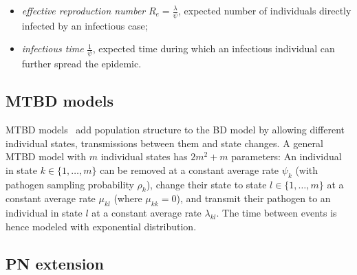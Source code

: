 \documentclass[a4paper,10pt]{article}
\begin{document}
\begin{itemize}
\item \textit{effective reproduction number} $R_e = \frac{\lambda}{\psi}$, expected number of individuals directly infected by an infectious case;
\item \textit{infectious time} $\frac{1}{\psi}$, expected time during which an infectious individual can further spread the epidemic.
\end{itemize} 



\subsection{MTBD models}
MTBD models~\citep{Stadler2013a} add population structure to the BD model by allowing different individual states, transmissions between them and state changes. A general MTBD model with $m$ individual states has $2m^2 + m$ parameters: An individual in state $k \in \{1, \ldots, m\}$ can be removed at a constant average rate $\psi_k$ (with pathogen sampling probability $\rho_k$), change their state to state $l \in \{1, \ldots, m\}$ at a constant average rate $\mu_{kl}$ (where $\mu_{kk} = 0$), and transmit their pathogen to an individual in state $l$ at a constant average rate $\lambda_{kl}$. The time between events %
is hence modeled with exponential distribution.


\subsection{PN extension}
\end{document}
